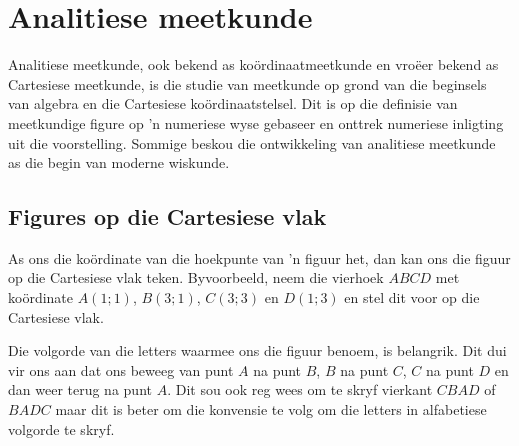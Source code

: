 \chapter{Analitiese meetkunde}
Analitiese meetkunde, ook bekend as koördinaatmeetkunde en vroëer bekend as Cartesiese meetkunde, is die studie van meetkunde op grond van die beginsels van algebra en die Cartesiese koördinaatstelsel. Dit is  op die definisie van meetkundige figure op ’n numeriese wyse gebaseer en onttrek numeriese inligting uit die voorstelling. Sommige beskou die ontwikkeling van analitiese meetkunde as die begin van moderne wiskunde.

\par 
{}
\section{Figures op die Cartesiese vlak}
As ons die koördinate van die hoekpunte van ’n figuur het, dan kan ons die figuur op die Cartesiese vlak teken.
Byvoorbeeld, neem die vierhoek $ABCD$ met koördinate $A(1;1)$, $B(3;1)$, $C(3;3)$ en $D(1;3)$ en stel dit voor op die Cartesiese vlak. \par 

\setcounter{subfigure}{0}
\begin{figure}[H] %
\begin{center}
\end{center}
\label{fig:cartesianplane}
\end{figure} 

Die volgorde van die letters waarmee ons die figuur benoem, is belangrik. Dit dui vir ons aan dat ons beweeg van punt $A$ na punt $B$, $B$ na punt $C$, $C$ na punt $D$ en dan weer terug na punt  $A$. Dit sou ook reg wees om te skryf vierkant $CBAD$ of $BADC$ maar dit is beter om die konvensie te volg om die letters in alfabetiese volgorde te skryf.     

